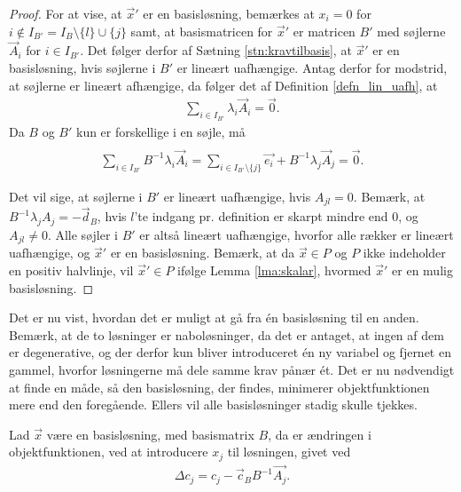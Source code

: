 \begin{proof}
For at vise, at $\vec{x}'$ er en basisløsning, bemærkes at $x_i = 0$ for $i \notin I_{B'} = I_B\setminus\{l\}\cup\{j\}$ samt, at basismatricen for $\vec{x}'$ er matricen $B'$ med søjlerne $\vec{A}_i$ for $i \in I_{B'}$. 
Det følger derfor af Sætning \ref{stn:kravtilbasis},
at $\vec{x}'$ er en basisløsning, hvis søjlerne i $B'$ er lineært uafhængige.
Antag derfor for modstrid, at søjlerne er lineært afhængige, da følger det af Definition \ref{defn_lin_uafh},
at
\begin{align*}
 \sum_{i \in I_{B'}} \lambda_i \vec{A}_i = \vec{0}.
\end{align*}
Da $B$ og $B'$ kun er forskellige i en søjle, må
\begin{align*}
 \\ \sum_{i \in I_{B'}}  B^{-1} \lambda_i \vec{A}_i  =\sum_{i \in I_{B'}\setminus \{j\}} \vec{e_i} + B^{-1} \lambda_j \vec{A}_j = \vec{0}.
\end{align*}

Det vil sige, at søjlerne i $B'$ er lineært uafhængige, hvis $A_{jl} = 0$.
Bemærk, at $B^{-1} \lambda_j A_j = - \vec{d}_B$, hvis $l$'te indgang pr. definition er skarpt mindre end $0$, og $A_{jl} \neq 0$.
Alle søjler i $B'$ er altså lineært uafhængige, hvorfor alle rækker er lineært uafhængige, og $\vec{x}'$ er en basisløsning.
Bemærk, at da $\vec{x}\in P$ og $P$ ikke indeholder en positiv halvlinje, vil $\vec{x}' \in P$ ifølge Lemma \ref{lma:skalar}, hvormed $\vec{x}'$ er en mulig basisløsning.
\end{proof}

Det er nu vist, hvordan det er muligt at gå fra én basisløsning til en anden.
Bemærk, at de to løsninger er naboløsninger, da det er antaget, at ingen af dem er degenerative, og der derfor kun bliver introduceret én ny variabel og fjernet en gammel, hvorfor løsningerne må dele samme krav pånær ét. 
Det er nu nødvendigt at finde en måde, så den basisløsning, der findes, minimerer objektfunktionen mere end den foregående. Ellers vil alle basisløsninger stadig skulle tjekkes. 

\begin{stn}
Lad $\vec{x}$ være en basisløsning, med basismatrix $B$, da er ændringen i objektfunktionen, ved at introducere $x_j$ til løsningen, givet ved
\begin{align*}
 \Delta c_j = c_j-\vec{c}_B B^{-1}\vec{A_j}.
\end{align*}
\label{stn:Deltac}
\end{stn}

